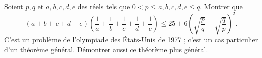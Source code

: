 Soient $p, q$ et $a, b, c, d, e$ des réels tels que $0 < p \leq a, b, c, d, e \leq q$. Montrer que
\[ (a + b + c + d + e)\left(\frac{1}{a} + \frac{1}{b} + \frac{1}{c} + \frac{1}{d} + \frac{1}{e}\right) \leq 25 + 6\left(\sqrt{\frac{p}{q}} - \sqrt{\frac{q}{p}}\right)^2. \]
C'est un problème de l'olympiade des États-Unis de 1977 ; c'est un cas particulier d'un théorème général. Démontrer aussi ce théorème plus général.
